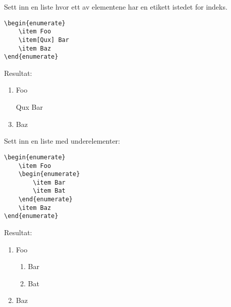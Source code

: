 \vspace{0.75em}
Sett inn en liste hvor ett av elementene har en etikett istedet for indeks.
\vspace{0.75em}
\begin{lstlisting}[language=Tex]
\begin{enumerate}
    \item Foo
    \item[Qux] Bar
    \item Baz
\end{enumerate}
\end{lstlisting}
\noindent Resultat:
\begin{enumerate}
    \item Foo
    \item[Qux] Bar
    \item Baz
\end{enumerate}
\vspace{0.75em}


\horizontalrule


\vspace{0.75em}
\noindent Sett inn en liste med underelementer:
\vspace{0.75em}
\begin{lstlisting}[language=Tex]
\begin{enumerate}
    \item Foo
    \begin{enumerate}
        \item Bar
        \item Bat
    \end{enumerate}
    \item Baz
\end{enumerate}
\end{lstlisting}
\vspace{0.75em}

\noindent Resultat:
\begin{enumerate}
    \item Foo
    \begin{enumerate}
        \item Bar
        \item Bat
    \end{enumerate}
    \item Baz
\end{enumerate}
